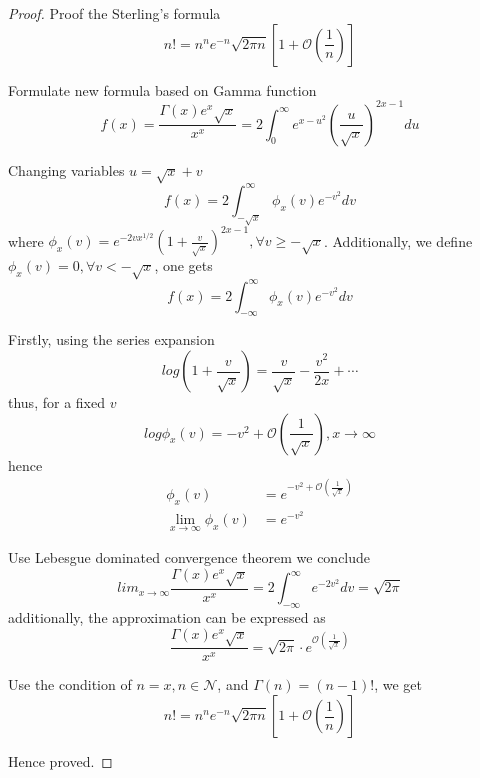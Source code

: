 \begin{proof}
    \label{Proof: Sterling's formula}
    Proof the Sterling's formula
    \begin{equation*}
        n! = n^n e^{-n} \sqrt{2 \pi n} [1 + \mathcal{O}(\frac{1}{n})]
    \end{equation*}

    Formulate new formula based on Gamma function
    \begin{equation*}
        f(x) = \frac{\Gamma(x) e^x \sqrt{x}}{x^x} =
        2 \int_{0}^{\infty} e^{x-u^2} (\frac{u}{\sqrt{x}})^{2x-1} du
    \end{equation*}

    Changing variables $u=\sqrt{x}+v$
    \begin{equation*}
        f(x) = 2 \int_{-\sqrt{x}}^{\infty} \phi_x(v) e^{-v^2} dv
    \end{equation*}
    where $\phi_x(v) = e^{-2vx^{1/2}} (1+\frac{v}{\sqrt{x}})^{2x-1}, \forall v \geq -\sqrt{x}$.
    Additionally, we define $\phi_x(v) = 0, \forall v < -\sqrt{x}$, one gets
    \begin{equation*}
        f(x) = 2 \int_{-\infty}^{\infty} \phi_x(v) e^{-v^2} dv
    \end{equation*}

    Firstly, using the series expansion
    \begin{equation*}
        log(1+\frac{v}{\sqrt{x}}) = \frac{v}{\sqrt{x}} - \frac{v^2}{2x} + \cdots
    \end{equation*}
    thus, for a fixed $v$
    \begin{equation*}
        log \phi_x(v) = -v^2 + \mathcal{O}(\frac{1}{\sqrt{x}}), x \rightarrow \infty
    \end{equation*}
    hence
    \begin{align*}
        \phi_x(v)                             & = e^{-v^2 + \mathcal{O}(\frac{1}{\sqrt{x}})} \\
        \lim_{x \rightarrow \infty} \phi_x(v) & = e^{-v^2}
    \end{align*}

    Use Lebesgue dominated convergence theorem
    we conclude
    \begin{equation*}
        lim_{x \rightarrow \infty} \frac{\Gamma(x) e^x \sqrt{x}}{x^x}
        = 2 \int_{-\infty}^{\infty} e^{-2 v^2} dv
        = \sqrt{2 \pi}
    \end{equation*}
    additionally, the approximation can be expressed as
    \begin{equation*}
        \frac{\Gamma(x) e^x \sqrt{x}}{x^x} = \sqrt{2 \pi} \cdot e^{\mathcal{O}(\frac{1}{\sqrt{x}})}
    \end{equation*}

    Use the condition of $n=x, n \in \mathcal{N}$, and $\Gamma(n) = (n-1)!$, we get
    \begin{equation*}
        n! = n^n e^{-n} \sqrt{2 \pi n} [1 + \mathcal{O}(\frac{1}{n})]
    \end{equation*}

    Hence proved.

\end{proof}

